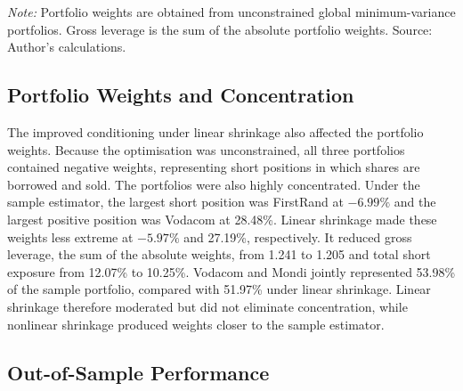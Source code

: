 \begin{table}[htbp]
\centering
\caption{Covariance-matrix and portfolio diagnostics}
\label{tab:diagnostics}
\small
{}

\parbox{\textwidth}{\footnotesize
\textit{Note:} Portfolio weights are obtained from unconstrained global
minimum-variance portfolios. Gross leverage is the sum of the absolute
portfolio weights. Source: Author's calculations.
}
\end{table}

\subsection{Portfolio Weights and Concentration}

The improved conditioning under linear shrinkage also affected the portfolio weights. Because the optimisation was unconstrained, all three portfolios contained negative weights, representing short positions in which shares are borrowed and sold. The portfolios were also highly concentrated. Under the sample estimator, the largest short position was FirstRand at $-6.99\%$ and the largest positive position was Vodacom at 28.48\%. Linear shrinkage made these weights less extreme at $-5.97\%$ and 27.19\%, respectively. It reduced gross leverage, the sum of the absolute weights, from 1.241 to 1.205 and total short exposure from 12.07\% to 10.25\%. Vodacom and Mondi jointly represented 53.98\% of the sample portfolio, compared with 51.97\% under linear shrinkage. Linear shrinkage therefore moderated but did not eliminate concentration, while nonlinear shrinkage produced weights closer to the sample estimator.

\subsection{Out-of-Sample Performance}

